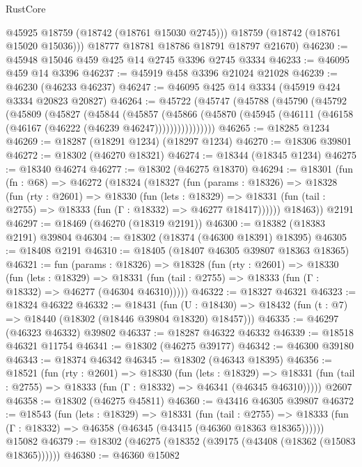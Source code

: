\begin{lexlean}{RustCore}
\begin{coremodule}
          @45925
          @18759
          (@18742 (@18761 @15030 @2745)))
        @18759
        (@18742 (@18761 @15020 @15036)))
      @18777
      @18781
      @18786
      @18791
      @18797
      @21670)
@46230 := @45948 @15046 @459 @425 @14 @2745 @3396 @2745 @3334
@46233 := @46095 @459 @14 @3396
@46237 := @45919 @458 @3396 @21024 @21028
@46239 := @46230 (@46233 @46237)
@46247 := @46095 @425 @14 @3334 (@45919 @424 @3334 @20823 @20827)
@46264 := @45722
    (@45747
      (@45788
        (@45790
          (@45792
            (@45809
              (@45827
                (@45844
                  (@45857
                    (@45866
                      (@45870 (@45945 (@46111 (@46158 (@46167 (@46222 (@46239 @46247))))))))))))))))
@46265 := @18285 @1234
@46269 := @18287 (@18291 @1234) (@18297 @1234)
@46270 := @18306 @39801
@46272 := @18302 (@46270 @18321)
@46274 := @18344 (@18345 @1234)
@46275 := @18340 @46274
@46277 := @18302 (@46275 @18370)
@46294 := @18301
    (fun (fn : @68) =>
    @46272
      (@18324
        (@18327
          (fun (params : @18326) =>
          @18328
            (fun (rty : @2601) =>
            @18330
              (fun (lets : @18329) =>
              @18331 (fun (tail : @2755) => @18333 (fun (Γ : @18332) => @46277 @18417))))))
        @18463))
    @2191
@46297 := @18469 (@46270 (@18319 @2191))
@46300 := @18382 (@18383 @2191) @39804
@46304 := @18302 (@18374 (@46300 @18391) @18395)
@46305 := @18408 @2191
@46310 := @18405 (@18407 @46305 @39807 @18363 @18365)
@46321 := fun (params : @18326) =>
  @18328
    (fun (rty : @2601) =>
    @18330
      (fun (lets : @18329) =>
      @18331 (fun (tail : @2755) => @18333 (fun (Γ : @18332) => @46277 (@46304 @46310)))))
@46322 := @18327 @46321
@46323 := @18324 @46322
@46332 := @18431
    (fun (U : @18430) => @18432 (fun (t : @7) => @18440 (@18302 (@18446 @39804 @18320) @18457)))
@46335 := @46297 (@46323 @46332) @39802
@46337 := @18287 @46322 @46332
@46339 := @18518 @46321 @11754
@46341 := @18302 (@46275 @39177)
@46342 := @46300 @39180
@46343 := @18374 @46342
@46345 := @18302 (@46343 @18395)
@46356 := @18521
    (fun (rty : @2601) =>
    @18330
      (fun (lets : @18329) =>
      @18331 (fun (tail : @2755) => @18333 (fun (Γ : @18332) => @46341 (@46345 @46310)))))
    @2607
@46358 := @18302 (@46275 @45811)
@46360 := @43416 @46305 @39807
@46372 := @18543
    (fun (lets : @18329) =>
    @18331
      (fun (tail : @2755) =>
      @18333 (fun (Γ : @18332) => @46358 (@46345 (@43415 (@46360 @18363 @18365))))))
    @15082
@46379 := @18302 (@46275 (@18352 (@39175 (@43408 (@18362 (@15083 @18365))))))
@46380 := @46360 @15082

\end{coremodule}
\end{lexlean}
